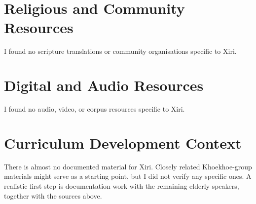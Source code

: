 \documentclass[12pt]{article}
\begin{document}
\section{Religious and Community Resources}
I found no scripture translations or community organisations specific to Xiri.

\section{Digital and Audio Resources}
I found no audio, video, or corpus resources specific to Xiri.

\section{Curriculum Development Context}
There is almost no documented material for Xiri. Closely related Khoekhoe-group materials might serve as a starting point, but I did not verify any specific ones. A realistic first step is documentation work with the remaining elderly speakers, together with the sources above.
\end{document}
